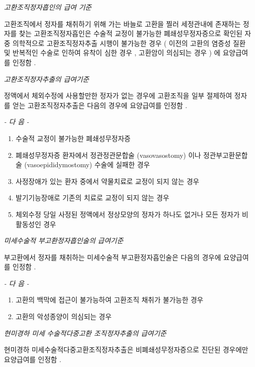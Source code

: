 {\emph{고환조직정자흡인의 급여 기준}\par 
고환조직에서 정자를 채취하기 위해 가는 바늘로 고환을 찔러  세정관내에 존재하는 정자를 찾는 고환조직정자흡인은 수술적  교정이 불가능한 폐쇄성무정자증으로 확인된 자 중 의학적으로  고환조직정자추출 시행이 불가능한 경우 ( 이전의  고환의 염증성  질환 및 반복적인 수술로 인하여 유착이 심한 경우 ,  고환암이 의심되는 경우 ) 에 요양급여를 인정함 . \par
 

\emph{고환조직정자추출의 급여기준}\par 
정액에서 체외수정에 사용할만한 정자가 없는 경우에 고환조직을  일부 절제하여 정자를 얻는 고환조직정자추출은 다음의 경우에 요양급여를 인정함 . \par

\emph{-  다 음  -}\par 
\begin{enumerate}[가.]\tightlist
\item 수술적 교정이 불가능한 폐쇄성무정자증 
\item 폐쇄성무정자증 환자에서 정관정관문합술 (vasovasostomy) 이나 정관부고환문합술 (vasoepididymostomy)  수술에 실패한  경우 
\item 사정장애가 있는 환자 중에서 약물치료로 교정이 되지 않는  경우 
\item 발기기능장애로 기존의 치료로 교정이 되지 않는 경우 
\item 체외수정 당일 사정된 정액에서 정상모양의 정자가 하나도  없거나 모든 정자가  비활동성인  경우 
\end{enumerate} 

\emph{미세수술적 부고환정자흡인술의 급여기준}\par 
부고환에서 정자를 채취하는 미세수술적 부고환정자흡인술은 다음의 경우에 요양급여를 인정함 . \par

\emph{-  다 음  -}\par 
\begin{enumerate}[가.]\tightlist
\item 고환의 백막에 접근이 불가능하여 고환조직 채취가 불가능한 경우 
\item 고환의 악성종양이 의심되는 경우 
\end{enumerate} 

\emph{현미경하 미세 수술적다중고환 조직정자추출의 급여기준}\par 
현미경하 미세수술적다중고환조직정자추출은 비폐쇄성무정자증으로 진단된 경우에만 요양급여를 인정함 . \par

}

